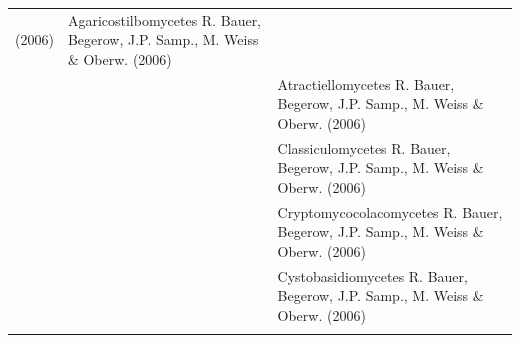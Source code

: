 \documentclass[]{book}
\begin{document}
\begin{longtable}[]{@{}lll@{}}
\begin{minipage}[t]{0.28\columnwidth}
(2006)\strut
\end{minipage} & \begin{minipage}[t]{0.31\columnwidth}\raggedright\strut
Agaricostilbomycetes R. Bauer, Begerow, J.P. Samp., M. Weiss \& Oberw.
(2006)\strut
\end{minipage}\tabularnewline
\begin{minipage}[t]{0.32\columnwidth}\raggedright\strut
\strut
\end{minipage} & \begin{minipage}[t]{0.28\columnwidth}\raggedright\strut
\strut
\end{minipage} & \begin{minipage}[t]{0.31\columnwidth}\raggedright\strut
Atractiellomycetes R. Bauer, Begerow, J.P. Samp., M. Weiss \& Oberw.
(2006)\strut
\end{minipage}\tabularnewline
\begin{minipage}[t]{0.32\columnwidth}\raggedright\strut
\strut
\end{minipage} & \begin{minipage}[t]{0.28\columnwidth}\raggedright\strut
\strut
\end{minipage} & \begin{minipage}[t]{0.31\columnwidth}\raggedright\strut
Classiculomycetes R. Bauer, Begerow, J.P. Samp., M. Weiss \& Oberw.
(2006)\strut
\end{minipage}\tabularnewline
\begin{minipage}[t]{0.32\columnwidth}\raggedright\strut
\strut
\end{minipage} & \begin{minipage}[t]{0.28\columnwidth}\raggedright\strut
\strut
\end{minipage} & \begin{minipage}[t]{0.31\columnwidth}\raggedright\strut
Cryptomycocolacomycetes R. Bauer, Begerow, J.P. Samp., M. Weiss \&
Oberw. (2006)\strut
\end{minipage}\tabularnewline
\begin{minipage}[t]{0.32\columnwidth}\raggedright\strut
\strut
\end{minipage} & \begin{minipage}[t]{0.28\columnwidth}\raggedright\strut
\strut
\end{minipage} & \begin{minipage}[t]{0.31\columnwidth}\raggedright\strut
Cystobasidiomycetes R. Bauer, Begerow, J.P. Samp., M. Weiss \& Oberw.
(2006)\strut
\end{minipage}\tabularnewline
\begin{minipage}[t]{0.32\columnwidth}\raggedright\strut

\end{minipage}
\end{longtable}
\end{document}
